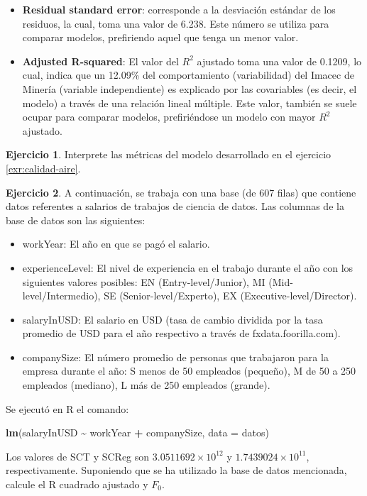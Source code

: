 \documentclass[
  11pt,
]{book}
\newenvironment{Shaded}{\begin{snugshade}}{\end{snugshade}}
\newcommand{\AttributeTok}[1]{\textcolor[rgb]{0.13,0.29,0.53}{#1}}
\newcommand{\FunctionTok}[1]{\textcolor[rgb]{0.13,0.29,0.53}{\textbf{#1}}}
\newcommand{\NormalTok}[1]{#1}
\newcommand{\SpecialCharTok}[1]{\textcolor[rgb]{0.81,0.36,0.00}{\textbf{#1}}}
\providecommand{\tightlist}{%
  \setlength{\itemsep}{0pt}\setlength{\parskip}{0pt}}
\theoremstyle{definition}
\theoremstyle{definition}
\theoremstyle{definition}
\newtheorem{exercise}{Ejercicio}[chapter]
\theoremstyle{definition}
\theoremstyle{remark}
\begin{document}
\begin{itemize}
\item
  \textbf{Residual standard error}: corresponde a la desviación estándar de los residuos, la cual, toma una valor de 6.238. Este número se utiliza para comparar modelos, prefiriendo aquel que tenga un menor valor.
\item
  \textbf{Adjusted R-squared}: El valor del \(R^2\) ajustado toma una valor de 0.1209, lo cual, indica que un 12.09\% del comportamiento (variabilidad) del Imacec de Minería (variable independiente) es explicado por las covariables (es decir, el modelo) a través de una relación lineal múltiple. Este valor, también se suele ocupar para comparar modelos, prefiriéndose un modelo con mayor \(R^2\) ajustado.
\end{itemize}

\begin{exercise}
Interprete las métricas del modelo desarrollado en el ejercicio \ref{exr:calidad-aire}.
\end{exercise}

\begin{exercise}
A continuación, se trabaja con una base (de 607 filas) que contiene datos referentes a salarios de trabajos de ciencia de datos. Las columnas de la base de datos son las siguientes:

\begin{itemize}
\tightlist
\item
  workYear: El año en que se pagó el salario.
\item
  experienceLevel: El nivel de experiencia en el trabajo durante el año con los siguientes valores posibles: EN (Entry-level/Junior), MI (Mid-level/Intermedio), SE (Senior-level/Experto), EX (Executive-level/Director).
\item
  salaryInUSD: El salario en USD (tasa de cambio dividida por la tasa promedio de USD para el año respectivo a través de fxdata.foorilla.com).
\item
  companySize: El número promedio de personas que trabajaron para la empresa durante el año: S menos de 50 empleados (pequeño), M de 50 a 250 empleados (mediano), L más de 250 empleados (grande).
\end{itemize}

Se ejecutó en R el comando:

\begin{Shaded}
\begin{Highlighting}[]
\FunctionTok{lm}\NormalTok{(salaryInUSD }\SpecialCharTok{\textasciitilde{}}\NormalTok{ workYear }\SpecialCharTok{+}\NormalTok{ companySize, }\AttributeTok{data =}\NormalTok{ datos)}
\end{Highlighting}
\end{Shaded}

Los valores de SCT y SCReg son \(\ensuremath{3.0511692\times 10^{12}}\) y \(\ensuremath{1.7439024\times 10^{11}}\), respectivamente. Suponiendo que se ha utilizado la base de datos mencionada, calcule el R cuadrado ajustado y \(F_0\).
\end{exercise}
\end{document}

